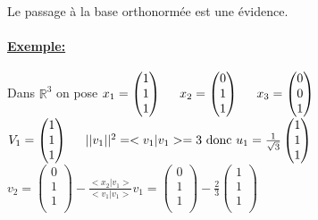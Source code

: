 \documentclass{article}
\newcommand\tab[1][1cm]{\hspace*{#1}}
\begin{document}
Le passage à la base orthonormée est une évidence.

\paragraph{\underline{Exemple:}}
Dans $\mathbb{R}^3$ on pose 
$x_1 = \begin{pmatrix}
    1\\
    1\\
    1\\
\end{pmatrix} \tab[0.5cm]
x_2 = \begin{pmatrix}
    0\\
    1\\
    1\\
\end{pmatrix} \tab[0.5cm]
x_3 = \begin{pmatrix}
    0\\
    0\\
    1\\
\end{pmatrix}$\\
$V_1 = \begin{pmatrix}
    1\\
    1\\
    1\\
\end{pmatrix} \tab[0.5cm]
||v_1||^2 = <v_1|v_1> = 3 \mbox{ donc } u_1 = \frac{1}{\sqrt{3}}\begin{pmatrix}
    1\\
    1\\
    1\\
\end{pmatrix}$\\
$v_2 = \begin{pmatrix}
    0\\
    1\\
    1\\
\end{pmatrix} - \frac{<x_2|v_1>}{<v_1|v_1>}v_1 = \begin{pmatrix}
    0\\
    1\\
    1\\
\end{pmatrix} - \frac{2}{3} \begin{pmatrix}
    1\\
    1\\
    1\\
\end{pmatrix}$\\
\end{document}
